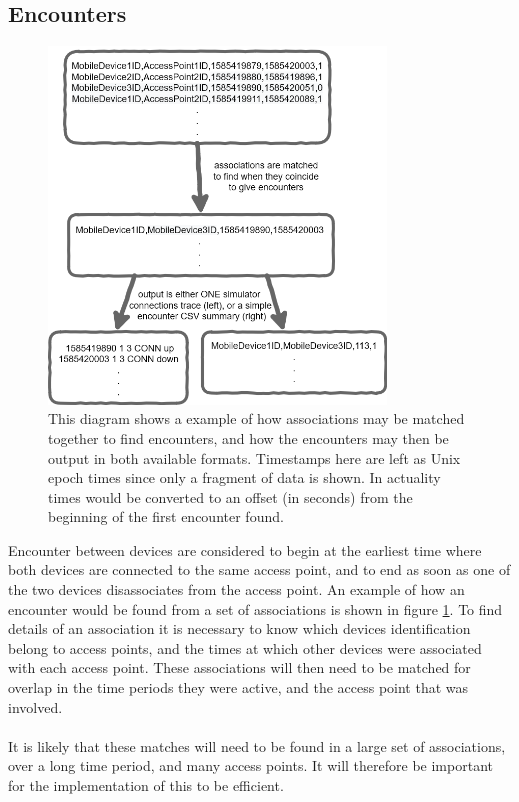 \subsection{Encounters} 
\begin{figure}[h]
    \centerline{\includegraphics[width=0.8\textwidth]{assoc_to_enc.png}}
    \caption{This diagram shows a example of how associations may be matched together to find encounters, and how the encounters may then be output in both available formats. Timestamps here are left as Unix epoch times since only a fragment of data is shown. In actuality times would be converted to an offset (in seconds) from the beginning of the first encounter found.}
    \label{fig:assoc_to_enc}
\end{figure}
Encounter between devices are considered to begin at the earliest time where both devices are connected to the same access point, and to end as soon as one of the two devices disassociates from the access point. An example of how an encounter would be found from a set of associations is shown in figure \ref{fig:assoc_to_enc}. To find details of an association it is necessary to know which devices identification belong to access points, and the times at which other devices were associated with each access point. These associations will then need to be matched for overlap in the time periods they were active, and the access point that was involved. \\\\
It is likely that these matches will need to be found in a large set of associations, over a long time period, and many access points. It will therefore be important for the implementation of this to be efficient.


